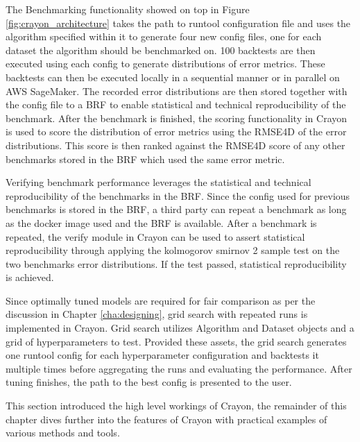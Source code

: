 The Benchmarking functionality showed on top in Figure \ref{fig:crayon_architecture} takes the path to runtool configuration file and uses the algorithm specified within it to generate four new config files, one for each dataset the algorithm should be benchmarked on. 100 backtests are then executed using each config to generate distributions of error metrics. These backtests can then be executed locally in a sequential manner or in parallel on AWS SageMaker. The recorded error distributions are then stored together with the config file to a BRF to enable statistical and technical reproducibility of the benchmark. After the benchmark is finished, the scoring functionality in Crayon is used to score the distribution of error metrics using the RMSE4D of the error distributions. This score is then ranked against the RMSE4D score of any other benchmarks stored in the BRF which used the same error metric.

Verifying benchmark performance leverages the statistical and technical reproducibility of the benchmarks in the BRF. Since the config used for previous benchmarks is stored in the BRF, a third party can repeat a benchmark as long as the docker image used and the BRF is available. After a benchmark is repeated, the verify module in Crayon can be used to assert statistical reproducibility through applying the kolmogorov smirnov 2 sample test on the two benchmarks error distributions. If the test passed, statistical reproducibility is achieved.

Since optimally tuned models are required for fair comparison as per the discussion in Chapter \ref{cha:designing}, grid search with repeated runs is implemented in Crayon. Grid search utilizes Algorithm and Dataset objects and a grid of hyperparameters to test. Provided these assets, the grid search generates one runtool config for each hyperparameter configuration and backtests it multiple times before aggregating the runs and evaluating the performance. After tuning finishes, the path to the best config is presented to the user.

This section introduced the high level workings of Crayon, the remainder of this chapter dives further into the features of Crayon with practical examples of various methods and tools.

